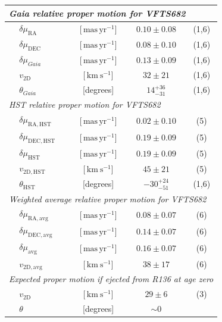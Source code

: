 \documentclass[a4paper,fleqn,usenatbib]{mnras}
\newcommand{\SdM}[1]{{{\color{brown}{#1}}}}
\newcommand{\kms}{{\,\mathrm{km\ s^{-1}}}}
\newcommand{\masyr}{\,\mathrm{mas}\,\mathrm{yr}^{-1}}
\begin{document}
\begin{table}
\begin{center}
\begin{tabular}{llc|c|c}
                


      \multicolumn{5}{l}{\emph{Gaia relative proper motion for VFTS682 }} \\
      \hline
      &$\delta\mu_\mathrm{RA}$  &[$\masyr$] & $0.10\pm0.08$ & (1,6) \\
      &$\delta\mu_\mathrm{DEC}$  &[$\masyr$] & $0.08\pm0.10$ &  (1,6) \\
      &$\delta\mu_{Gaia}$  &[$\masyr$] & $0.13\pm0.09$ &  (1,6) \\
      &$v_\mathrm{2D}$  &[$\kms$] & $32\pm21$ & (1,6)\\  
      &$\theta_{Gaia}$  &[degrees] &  $14_{-31}^{+36}$  & (1,6)\\  

 \hline     
      \multicolumn{5}{l}{\emph{HST relative proper motion for VFTS682}} \\
            \hline
      &$\delta\mu_\mathrm{RA, HST}$  &[$\masyr$] & $0.02\pm0.10$ & (5) \\
      &$\delta\mu_\mathrm{DEC, HST}$  &[$\masyr$] & $0.19\pm0.09$ &  (5) \\
       &$\delta\mu_\mathrm{HST}$  &[$\masyr$] & $0.19\pm0.09$ &  (5) \\
                  &$v_\mathrm{2D, HST}$  &[$\kms$] & $45\pm21$ & (5)\\  
                      &$\theta_\mathrm{HST}$  &[degrees] &   $-30_{-51}^{+24}$   & (1,6)\\  
      \hline
      \multicolumn{5}{l}{\emph{Weighted average relative proper motion
      for VFTS682}}\\
      \hline
      &$\delta\mu_\mathrm{RA, avg}$  &[$\masyr$] & $0.08\pm0.07$ & (6) \\
      &$\delta\mu_\mathrm{DEC, avg}$  &[$\masyr$] & $0.14\pm0.07$ &  (6) \\
       &$\delta\mu_\mathrm{avg}$  &[$\masyr$] & $0.16\pm0.07$ &  (6) \\
      &$v_\mathrm{2D, avg}$  &[$\kms$] & $38\pm17$ & (6)\\
      \hline
       \multicolumn{5}{l}{\emph{Expected proper motion if ejected from
      R136 at age zero}} \\
      \hline
      &$v_\mathrm{2D}$  &[$\kms$] & $29\pm 6$ & (3) \\  
      &$\theta$  &[degrees] &  $\sim0$  & \\ 
       \hline
    \end{tabular}


\end{center}
\end{table}
\end{document}
